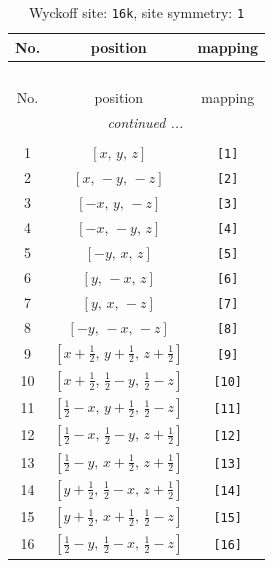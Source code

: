 \documentclass[fleqn,8pt]{jsarticle}
\begin{document}
\begin{longtable}{ccc}
\caption{Wyckoff site: {\tt 16k}, site symmetry: {\tt 1}}
 \\
 \hline \hline
No. & position & mapping \\ \hline \endfirsthead

\multicolumn{2}{l}{\tablename\ \thetable{}} \\
 \hline \hline
No. & position & mapping \\ \hline \endhead

 \hline \hline
\multicolumn{2}{r}{\footnotesize\it continued ...} \\ \endfoot

 \hline \hline
\multicolumn{2}{r}{} \\ \endlastfoot

1 & $\left[ x,\, y,\, z \right]$ & {\tt [1]} \\ \hline
2 & $\left[ x,\, - y,\, - z \right]$ & {\tt [2]} \\ \hline
3 & $\left[ - x,\, y,\, - z \right]$ & {\tt [3]} \\ \hline
4 & $\left[ - x,\, - y,\, z \right]$ & {\tt [4]} \\ \hline
5 & $\left[ - y,\, x,\, z \right]$ & {\tt [5]} \\ \hline
6 & $\left[ y,\, - x,\, z \right]$ & {\tt [6]} \\ \hline
7 & $\left[ y,\, x,\, - z \right]$ & {\tt [7]} \\ \hline
8 & $\left[ - y,\, - x,\, - z \right]$ & {\tt [8]} \\ \hline
9 & $\left[ x + \frac{1}{2},\, y + \frac{1}{2},\, z + \frac{1}{2} \right]$ & {\tt [9]} \\ \hline
10 & $\left[ x + \frac{1}{2},\, \frac{1}{2} - y,\, \frac{1}{2} - z \right]$ & {\tt [10]} \\ \hline
11 & $\left[ \frac{1}{2} - x,\, y + \frac{1}{2},\, \frac{1}{2} - z \right]$ & {\tt [11]} \\ \hline
12 & $\left[ \frac{1}{2} - x,\, \frac{1}{2} - y,\, z + \frac{1}{2} \right]$ & {\tt [12]} \\ \hline
13 & $\left[ \frac{1}{2} - y,\, x + \frac{1}{2},\, z + \frac{1}{2} \right]$ & {\tt [13]} \\ \hline
14 & $\left[ y + \frac{1}{2},\, \frac{1}{2} - x,\, z + \frac{1}{2} \right]$ & {\tt [14]} \\ \hline
15 & $\left[ y + \frac{1}{2},\, x + \frac{1}{2},\, \frac{1}{2} - z \right]$ & {\tt [15]} \\ \hline
16 & $\left[ \frac{1}{2} - y,\, \frac{1}{2} - x,\, \frac{1}{2} - z \right]$ & {\tt [16]} \\
\end{longtable}
\end{document}
